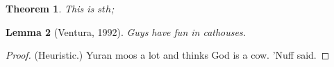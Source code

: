 \documentclass[letterpaper]{article}
\newtheorem{theorem}{Theorem}[section]
\newtheorem{lemma}[theorem]{Lemma}
\begin{document}
\begin{theorem}
    This is $sth$;
\end{theorem}

\begin{lemma}[Ventura, 1992]
    Guys have fun in cathouses.
\end{lemma}

\begin{proof}
    (Heuristic.) Yuran moos a lot and thinks God is a cow. ’Nuff said.
\end{proof}
\end{document}
